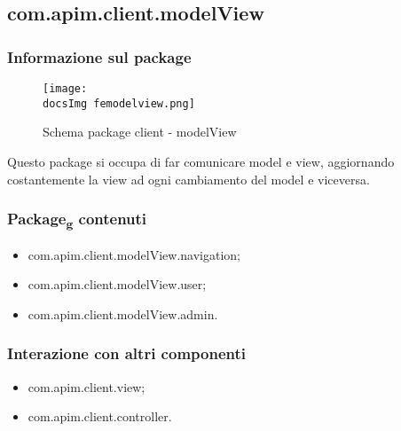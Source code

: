 {	\subsection{com.apim.client.modelView}{
		\subsubsection{Informazione sul package}{
			\begin{figure}[H]
				\centering
				\texttt{[image: \\docsImg femodelview.png]}
				\caption{Schema package client - modelView}
			\end{figure}
			Questo package si occupa di far comunicare model e view, aggiornando costantemente la view ad ogni cambiamento del model e viceversa.
		}
		\subsubsection{Package\textsubscript{g} contenuti}{
			\begin{itemize}
				\item com.apim.client.modelView.navigation;
				\item com.apim.client.modelView.user;
				\item com.apim.client.modelView.admin.
			\end{itemize}
		}
		\subsubsection{Interazione con altri componenti}{
			\begin{itemize}
				\item com.apim.client.view;
				\item com.apim.client.controller.
			\end{itemize}
}}}
